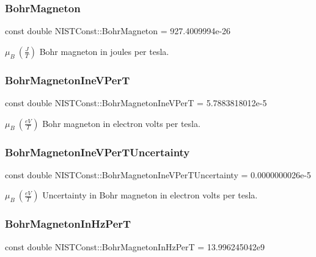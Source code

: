 \subsubsection{\texorpdfstring{Bohr\+Magneton}{BohrMagneton}}
{\footnotesize\ttfamily const double N\+I\+S\+T\+Const\+::\+Bohr\+Magneton = 927.\+4009994e-\/26}

$\mu_B \ (\frac{J}{T})$ Bohr magneton in joules per tesla. \mbox{\label{group___bohr_magneton_ga8b97d10b13a2c5de4f0d268370bc3c50}} 
\subsubsection{\texorpdfstring{Bohr\+Magneton\+Ine\+V\+PerT}{BohrMagnetonIneVPerT}}
{\footnotesize\ttfamily const double N\+I\+S\+T\+Const\+::\+Bohr\+Magneton\+Ine\+V\+PerT = 5.\+7883818012e-\/5}

$\mu_B \ (\frac{eV}{T})$ Bohr magneton in electron volts per tesla. \mbox{\label{group___bohr_magneton_gaaecd1151f7f9e12288a05ba80fb94bbd}} 
\subsubsection{\texorpdfstring{Bohr\+Magneton\+Ine\+V\+Per\+T\+Uncertainty}{BohrMagnetonIneVPerTUncertainty}}
{\footnotesize\ttfamily const double N\+I\+S\+T\+Const\+::\+Bohr\+Magneton\+Ine\+V\+Per\+T\+Uncertainty = 0.\+0000000026e-\/5}

$\mu_B \ (\frac{eV}{T})$ Uncertainty in Bohr magneton in electron volts per tesla. \mbox{\label{group___bohr_magneton_ga0c3cc268d0e1abc4703ea8f2c11ccab8}} 
\subsubsection{\texorpdfstring{Bohr\+Magneton\+In\+Hz\+PerT}{BohrMagnetonInHzPerT}}
{\footnotesize\ttfamily const double N\+I\+S\+T\+Const\+::\+Bohr\+Magneton\+In\+Hz\+PerT = 13.\+996245042e9}

